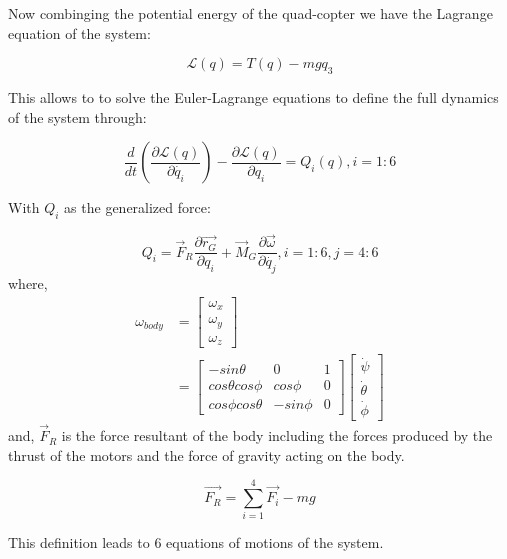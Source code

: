 \documentclass{article}
\begin{document}
Now combinging the potential energy of the quad-copter we have the Lagrange equation of the system:

\begin{equation}
\mathcal{L}(q)=T(q)-mgq_{3}
\end{equation}

This allows to to solve the Euler-Lagrange equations to define the full dynamics of the system through:

\begin{equation}
\frac{d}{dt}(\frac{\partial\mathcal{L}(q)}{\partial\dot{q_{i}}})-\frac{\partial\mathcal{L}(q)}{\partial q_{i}}=Q_{i}(q), i=1:6
\end{equation}

With $Q_{i}$ as the generalized force:

\begin{equation}
Q_{i}=\overrightarrow{F}_{R}\frac{\partial\overrightarrow{r_{G}}}{\partial q_{i}}+\overrightarrow{M}_{G}\frac{\partial\overrightarrow{\omega}}{\partial\dot{q_{j}}}, i=1:6, j=4:6
\end{equation}
where,
\begin{equation}
\begin{split}
\omega_{body}&=\left[\begin{array}{c}
\omega_{x}\\
\omega_{y}\\
\omega_{z}
\end{array}\right] \\
&=\left[\begin{array}{ccc}
-sin\theta & 0 & 1\\
cos\theta cos\phi & cos\phi & 0\\
cos\phi cos\theta & -sin\phi & 0
\end{array}\right]\left[\begin{array}{c}
\dot{\psi}\\
\dot{\theta}\\
\dot{\phi}
\end{array}\right]
\end{split}
\end{equation}
and, $\overrightarrow{F}_{R}$ is the force resultant of the body including the forces produced by the thrust of the motors and the force of gravity acting on the body.

\begin{equation}
\overrightarrow{F_{R}}=\sum_{i=1}^{4}\overrightarrow{F_{i}}-mg
\end{equation}

This definition leads to 6 equations of motions of the system.
\end{document}
